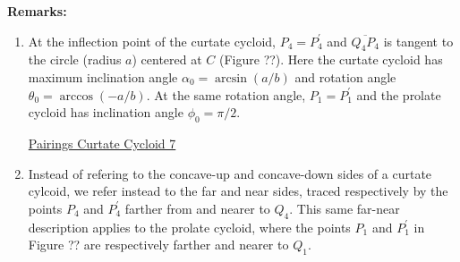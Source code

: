 \documentclass{ximera}
\begin{document}
{\bf Remarks:} 
\begin{enumerate}

\item At the inflection point of the curtate cycloid, $P_4 =P_4^\prime$ and $\overline{Q_4P_4}$ is tangent to the circle (radius $a$) centered at $C$ (Figure ??). Here the curtate cycloid has maximum inclination angle $\alpha_0 = \arcsin(a/b)$ and rotation angle $\theta_0 = \arccos(-a/b)$. At the same rotation angle, $P_1 = P_1^\prime$ and the prolate cycloid has inclination angle $\phi_0 = \pi/2$.

\begin{onlineOnly}
    \begin{center}
\end{center}
\end{onlineOnly}

\href{https://www.desmos.com/calculator/bxdgsjmh1m}{Pairings Curtate Cycloid 7}

\item Instead of refering to the concave-up and concave-down sides of a curtate cylcoid, we refer instead to the far and near sides, traced respectively by the points $P_4$ and $P_4^\prime$ farther from and nearer to $Q_4$. This same far-near description applies to the prolate cycloid, where the points $P_1$ and $P_1^\prime$ in Figure ?? are respectively farther and nearer to $Q_1$.

\end{enumerate}






\end{document}
